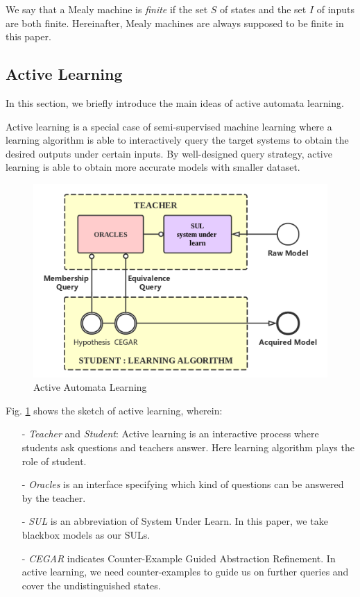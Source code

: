 \documentclass[conference, a4paper]{IEEEtran}
\begin{document}
We say that a Mealy machine is \emph{finite} if the set $S$ of states and the set $I$ of inputs are
both finite. Hereinafter, Mealy machines are always supposed to be finite in this paper.


\subsection{Active Learning}
In this section, we briefly introduce the main ideas of active automata learning. 

Active learning \cite{settles2010active} is a special case of semi-supervised machine learning where
a learning algorithm is able to interactively query the target systems to obtain the desired outputs
under certain inputs. By well-designed query strategy, active learning is able to obtain more
accurate models with smaller dataset. 

\begin{figure}[ht]
  \begin{center}
    \includegraphics[width=.5\textwidth]{./images/activelearning.png}
  \end{center}
  \caption{Active Automata Learning}
  \label{fig:activelearning}
\end{figure}

Fig. \ref{fig:activelearning} shows the sketch of active learning, wherein:
\begin{itemize}
  \item[-] \emph{Teacher} and \emph{Student}: Active learning is an interactive process where
    students ask questions and teachers answer. Here learning algorithm plays the role of student.
  \item[-] \emph{Oracles} is an interface specifying which kind of questions can be answered by the
    teacher.
  \item[-] \emph{SUL} is an abbreviation of System Under Learn. In this paper, we take blackbox
    models as our SULs.
  \item[-] \emph{CEGAR} indicates Counter-Example Guided Abstraction
    Refinement\cite{DBLP:conf/cav/ClarkeGJLV00}. In active learning, we need counter-examples to
    guide us on further queries and cover the undistinguished states.
\end{itemize}
\end{document}
